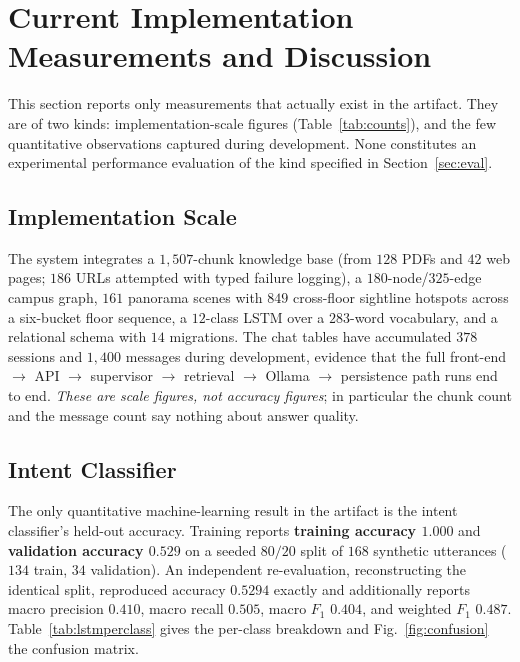 \section{Current Implementation Measurements and Discussion}
\label{sec:results}



This section reports only measurements that actually exist in the artifact.
They are of two kinds: implementation-scale figures
(Table~\ref{tab:counts}), and the few quantitative observations captured
during development. None constitutes an experimental performance evaluation
of the kind specified in Section~\ref{sec:eval}.

\subsection{Implementation Scale}
The system integrates a $1{,}507$-chunk knowledge base (from $128$ PDFs and
$42$ web pages; $186$ URLs attempted with typed failure logging), a
$180$-node/$325$-edge campus graph, $161$ panorama scenes with $849$
cross-floor sightline hotspots across a six-bucket floor sequence, a
$12$-class LSTM over a $283$-word vocabulary, and a relational schema with
$14$ migrations. The chat tables have accumulated $378$ sessions and
$1{,}400$ messages during development, evidence that the full front-end
$\to$ API $\to$ supervisor $\to$ retrieval $\to$ Ollama $\to$ persistence
path runs end to end. \emph{These are scale figures, not accuracy figures};
in particular the chunk count and the message count say nothing about
answer quality.

\subsection{Intent Classifier}
The only quantitative machine-learning result in the artifact is the intent
classifier's held-out accuracy. Training reports \textbf{training accuracy
$1.000$} and \textbf{validation accuracy $0.529$} on a seeded $80/20$ split
of $168$ synthetic utterances ($134$ train, $34$ validation). An
independent re-evaluation, reconstructing the identical split, reproduced
accuracy $0.5294$ exactly and additionally reports macro precision $0.410$,
macro recall $0.505$, macro $F_1$ $0.404$, and weighted $F_1$ $0.487$.
Table~\ref{tab:lstmperclass} gives the per-class breakdown and
Fig.~\ref{fig:confusion} the confusion matrix.

